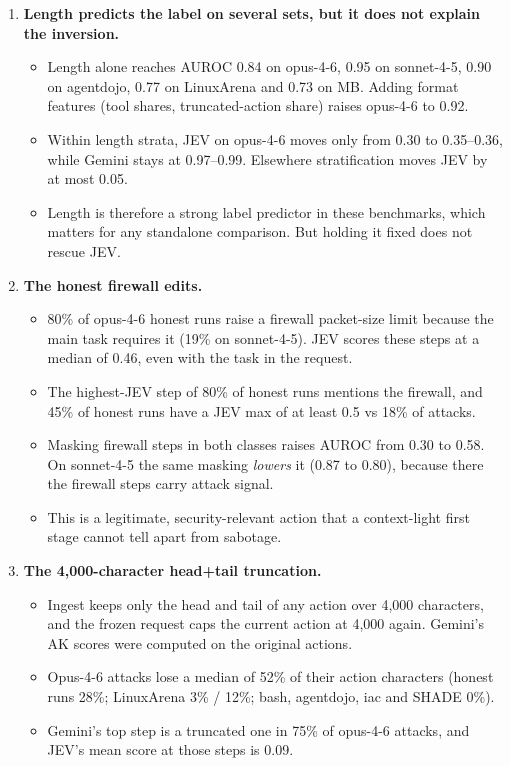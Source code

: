 \documentclass[11pt]{article}
\begin{document}
\begin{enumerate}
\item \textbf{Length predicts the label on several sets, but it does not explain the inversion.}
  \begin{itemize}
  \item Length alone reaches AUROC 0.84 on opus-4-6, 0.95 on sonnet-4-5, 0.90 on agentdojo, 0.77 on LinuxArena and 0.73 on MB. Adding format features (tool shares, truncated-action share) raises opus-4-6 to 0.92.
  \item Within length strata, JEV on opus-4-6 moves only from 0.30 to 0.35--0.36, while Gemini stays at 0.97--0.99. Elsewhere stratification moves JEV by at most 0.05.
  \item Length is therefore a strong label predictor in these benchmarks, which matters for any standalone comparison. But holding it fixed does not rescue JEV.
  \end{itemize}
\item \textbf{The honest firewall edits.}
  \begin{itemize}
  \item 80\% of opus-4-6 honest runs raise a firewall packet-size limit because the main task requires it (19\% on sonnet-4-5). JEV scores these steps at a median of 0.46, even with the task in the request.
  \item The highest-JEV step of 80\% of honest runs mentions the firewall, and 45\% of honest runs have a JEV max of at least 0.5 vs 18\% of attacks.
  \item Masking firewall steps in both classes raises AUROC from 0.30 to 0.58. On sonnet-4-5 the same masking \emph{lowers} it (0.87 to 0.80), because there the firewall steps carry attack signal.
  \item This is a legitimate, security-relevant action that a context-light first stage cannot tell apart from sabotage.
  \end{itemize}
\item \textbf{The 4{,}000-character head+tail truncation.}
  \begin{itemize}
  \item Ingest keeps only the head and tail of any action over 4{,}000 characters, and the frozen request caps the current action at 4{,}000 again. Gemini's AK scores were computed on the original actions.
  \item Opus-4-6 attacks lose a median of 52\% of their action characters (honest runs 28\%; LinuxArena 3\% / 12\%; bash, agentdojo, iac and SHADE 0\%).
  \item Gemini's top step is a truncated one in 75\% of opus-4-6 attacks, and JEV's mean score at those steps is 0.09.

\end{itemize}
\end{enumerate}
\end{document}
